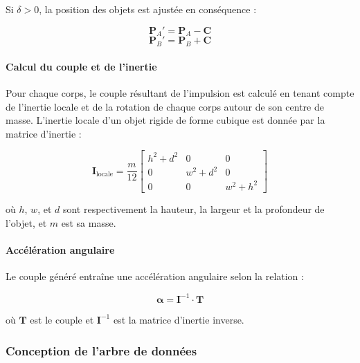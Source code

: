 \begin{multicols}{2}
        Si \( \delta > 0 \), la position des objets est ajustée en conséquence :
        
        \begin{equation}
        \mathbf{P}_A' = \mathbf{P}_A - \mathbf{C}
        \end{equation}
        \begin{equation}
        \mathbf{P}_B' = \mathbf{P}_B + \mathbf{C}
        \end{equation}
        
        \paragraph{Calcul du couple et de l'inertie}
        Pour chaque corps, le couple résultant de l'impulsion est calculé en tenant compte
        de l'inertie locale et de la rotation de chaque corps autour de son centre de masse.
        L'inertie locale d'un objet rigide de forme cubique est donnée par la matrice d'inertie :
        
        \begin{equation}
        \mathbf{I}_{\text{locale}} = \frac{m}{12} \begin{bmatrix} h^2 + d^2 & 0 & 0 \\ 0 & w^2 + d^2 & 0 \\ 0 & 0 & w^2 + h^2 \end{bmatrix}
        \end{equation}
        
        où \( h \), \( w \), et \( d \) sont respectivement la hauteur, la largeur et la profondeur de l'objet, et \( m \) est sa masse.
        
        \paragraph{Accélération angulaire}
        Le couple généré entraîne une accélération angulaire selon la relation :
        
        \begin{equation}
        \mathbf{\alpha} = \mathbf{I}^{-1} \cdot \mathbf{T}
        \end{equation}
        
        où \( \mathbf{T} \) est le couple et \( \mathbf{I}^{-1} \) est la matrice d'inertie inverse.
        
    \end{multicols}

\subsubsection{Conception de l'arbre de données}

